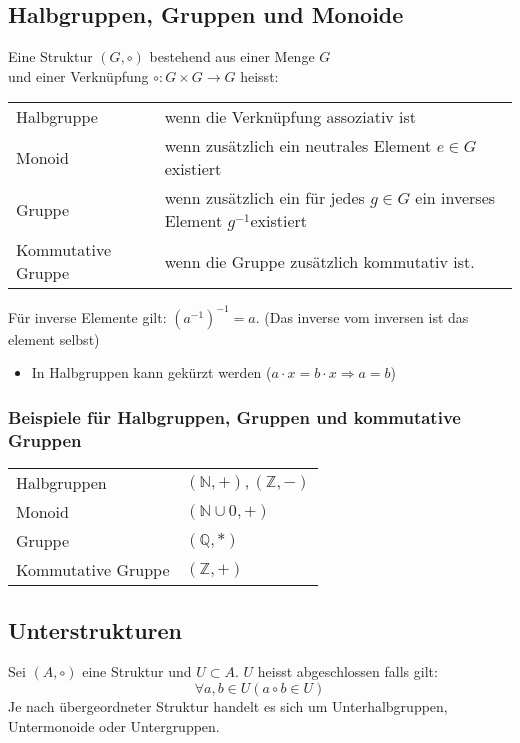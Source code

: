\subsection{Halbgruppen, Gruppen und Monoide}
Eine Struktur $(G, \circ)$ bestehend aus einer Menge $G$\\
 und einer Verknüpfung $\circ: G \times G \rightarrow G$ heisst:
\settowidth{\MyLenA}{Kommutative Gruppe ~~}
\begin{tabular}{@{}p{\the\MyLenA}%
				@{}p{(\linewidth - \the\MyLenA)}}
	Halbgruppe & wenn die Verknüpfung assoziativ ist\\
	Monoid & wenn zusätzlich ein neutrales Element $e \in G$ existiert\\
	Gruppe & wenn zusätzlich ein für jedes $g \in G$ ein inverses Element $g^{-1}$existiert\\
	Kommutative Gruppe & wenn die Gruppe zusätzlich kommutativ ist.\\
\end{tabular}
Für inverse Elemente gilt: $(a^{-1})^{-1} = a$. (Das inverse vom inversen ist das element selbst)

\begin{itemize}
	\item In Halbgruppen kann gekürzt werden ($a \cdot x = b \cdot x \Rightarrow a = b$)
\end{itemize}

\subsubsection{Beispiele für Halbgruppen, Gruppen und kommutative Gruppen}
\settowidth{\MyLenA}{Kommutative Gruppe ~~}
\begin{tabular}{@{}p{\the\MyLenA}%
				@{}p{}}
	Halbgruppen & $(\mathbb{N}, +), (\mathbb{Z, -})$\\
	Monoid & $(\mathbb{N} \cup {0}, +)$\\
	Gruppe & $(\mathbb{Q}, *)$\\
	Kommutative Gruppe & $(\mathbb{Z}, +)$\\
\end{tabular}

\subsection{Unterstrukturen}
Sei $(A, \circ)$ eine Struktur und $U \subset A$. $U$ heisst abgeschlossen falls gilt:
	\begin{equation*}
		\forall a, b \in U (a \circ b \in U)
	\end{equation*}
Je nach übergeordneter Struktur handelt es sich um Unterhalbgruppen, Untermonoide oder Untergruppen.

